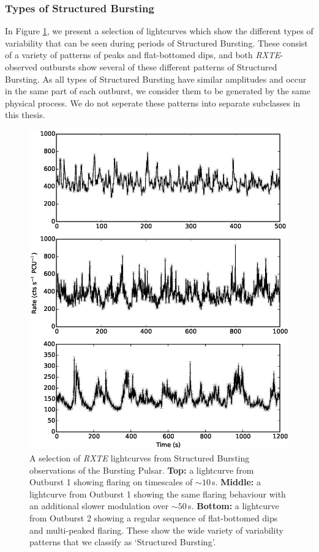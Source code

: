 \subsubsection{Types of Structured Bursting}
\label{sec:struc_var}

\par In Figure \ref{fig:Types_Struc}, we present a selection of lightcurves which show the different types of variability that can be seen during periods of Structured Bursting.  These consist of a variety of patterns of peaks and flat-bottomed dips, and both \textit{RXTE}-observed outbursts show several of these different patterns of Structured Bursting.  As all types of Structured Bursting have similar amplitudes and occur in the same part of each outburst, we consider them to be generated by the same physical process.  We do not seperate these patterns into separate subclasses in this thesis.

\begin{figure}
  \centering
  \includegraphics[width=.9\linewidth, trim={0.8cm 0 1.5cm 0},clip]{images/many_struc.eps}
  \caption[A selection of \textit{RXTE} lightcurves from Structured Bursting observations of the Bursting Pulsar.]{\small A selection of \textit{RXTE} lightcurves from Structured Bursting observations of the Bursting Pulsar.  \textbf{Top:} a lightcurve from Outburst 1 showing flaring on timescales of $\sim10$\,s.  \textbf{Middle:} a lightcurve from Outburst 1 showing the same flaring behaviour with an additional slower modulation over $\sim50$\,s.  \textbf{Bottom:} a lightcurve from Outburst 2 showing a regular sequence of flat-bottomed dips and multi-peaked flaring.  These show the wide variety of variability patterns that we classify as `Structured Bursting'.}
  \label{fig:Types_Struc}
\end{figure}

